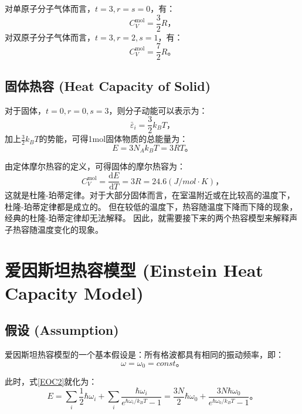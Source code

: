 \documentclass[declarePage]{ecnuthesis}
\begin{document}
对单原子分子气体而言，$t=3,r=s=0$，有：
\begin{equation}
    C_V^{\mathrm{mol}} = \frac{3}{2} R \text{，}
\end{equation}
对双原子分子气体而言，$t=3,r=2,s=1$，有：
\begin{equation}
    C_V^{\mathrm{mol}} = \frac{7}{2} R \text{。} 
\end{equation}

\subsection{固体热容 (Heat Capacity of Solid)}

对于固体，$t=0,r=0,s=3$，则分子动能可以表示为：
\begin{equation}
    \bar \varepsilon _i = \frac{3}{2} k_BT \text{，}
\end{equation}
加上$\frac{3}{2} k_BT$的势能，可得1mol固体物质的总能量为：
\begin{equation}
    E = 3N_A k_B T = 3RT \text{。}
\end{equation}

由定体摩尔热容的定义，可得固体的摩尔热容为：
\begin{equation}
    C_V^{\mathrm{mol}} = \frac{\mathrm{d}E}{\mathrm{d}T} = 3R = 24.6(J/mol\cdot K) \text{，} 
\end{equation}
这就是杜隆-珀蒂定律。对于大部分固体而言，在室温附近或在比较高的温度下，杜隆-珀蒂定律都是成立的。%
但在较低的温度下，热容随温度下降而下降的现象，经典的杜隆-珀蒂定律却无法解释。%
因此，就需要接下来的两个热容模型来解释声子热容随温度变化的现象。

\section{爱因斯坦热容模型 (Einstein Heat Capacity Model)}

\subsection{假设 (Assumption)}

爱因斯坦热容模型的一个基本假设是：所有格波都具有相同的振动频率，即：
\begin{equation}
    \omega = \omega_0 = const \text{。} 
\end{equation}

此时，式\ref{EOC2}就化为：
\begin{equation}
    E = \sum_i \frac{1}{2}\hbar \omega_i + \sum_i \frac{\hbar \omega_i}{e^{\hbar \omega_i / k_B T}-1} = \frac{3N}{2}\hbar\omega_0 + \frac{3N\hbar\omega_0}{e^{\hbar \omega_0 / k_B T}-1} \text{。}
\end{equation}
\end{document}
